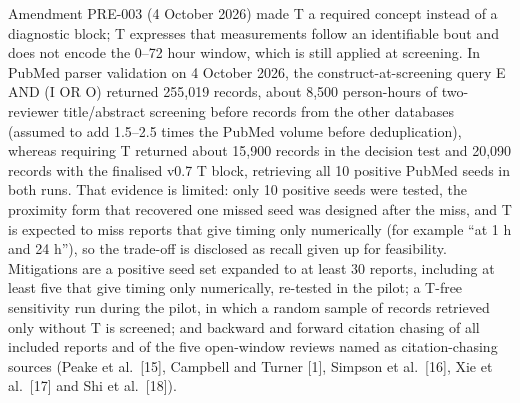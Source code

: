\documentclass[
  11pt,
  a4paper,
]{article}
\begin{document}
Amendment PRE-003 (4 October 2026) made T a required concept instead of
a diagnostic block; T expresses that measurements follow an identifiable
bout and does not encode the 0--72 hour window, which is still applied
at screening. In PubMed parser validation on 4 October 2026, the
construct-at-screening query E AND (I OR O) returned 255,019 records,
about 8,500 person-hours of two-reviewer title/abstract screening before
records from the other databases (assumed to add 1.5--2.5 times the
PubMed volume before deduplication), whereas requiring T returned about
15,900 records in the decision test and 20,090 records with the
finalised v0.7 T block, retrieving all 10 positive PubMed seeds in both
runs. That evidence is limited: only 10 positive seeds were tested, the
proximity form that recovered one missed seed was designed after the
miss, and T is expected to miss reports that give timing only
numerically (for example ``at 1 h and 24 h''), so the trade-off is
disclosed as recall given up for feasibility. Mitigations are a positive
seed set expanded to at least 30 reports, including at least five that
give timing only numerically, re-tested in the pilot; a T-free
sensitivity run during the pilot, in which a random sample of records
retrieved only without T is screened; and backward and forward citation
chasing of all included reports and of the five open-window reviews
named as citation-chasing sources (Peake et al.~{[}15{]}, Campbell and
Turner {[}1{]}, Simpson et al.~{[}16{]}, Xie et al.~{[}17{]} and Shi et
al.~{[}18{]}).
\end{document}
